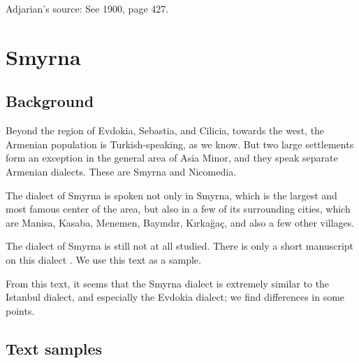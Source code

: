 Adjarian's source: See  1900, page 427. 








\chapter{Smyrna} \label{chapter:Smyrna}
\section{Background}

\begin{adjarianpage}\label{page:239}\end{adjarianpage}%

Beyond the region of Evdokia, Sebastia, and Cilicia, towards the west, the   Armenian population is  Turkish-speaking, as we know. But two large settlements form an exception in the general area of Asia Minor, and they speak   separate Armenian dialects. These are Smyrna and Nicomedia. 

The dialect of Smyrna is spoken not only in Smyrna, which is the largest and most famous center of the area, but also in a few of its surrounding cities, which are Manisa, Kasaba, Menemen, Bayındır, Kırkağaç, and also a few other villages. 

The dialect of Smyrna is still not at all studied. There is only a short manuscript on this dialect \citep[300]{Kosian-smyrna}. We use this text as a sample. 

From this text, it seems that the Smyrna dialect is extremely similar to the Istanbul dialect, and especially the Evdokia dialect; we find differences in some points. 

\section{Text samples}

{\sampleoverview}

